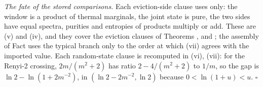 \emph{The fate of the stored comparisons.} Each eviction-side clause uses only: the window is a product of thermal marginals, the joint state is pure, the two sides have equal spectra, purities and entropies of products multiply or add. These are (v) and (iv), and they cover the eviction clauses of Theorems ,  and ; the assembly of Fact  uses the typical branch only to the order at which (vii) agrees with the imported value. Each random-state clause is recomputed in (vi), (vii): for the Renyi-2 crossing, $2m/(m^{2}+2)$ has ratio $2 - 4/(m^{2}+2)$ to $1/m$, so the gap is $\ln 2 - \ln(1 + 2m^{-2})$, in $(\ln 2 - 2m^{-2}, \ln 2)$ because $0 < \ln(1+u) < u$. $\square$
